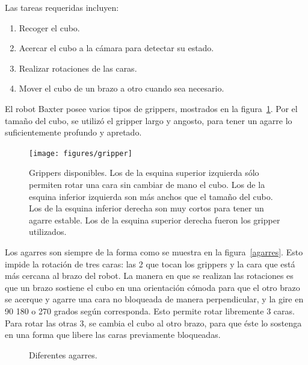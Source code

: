 Las tareas requeridas incluyen:
\begin{enumerate}
	\item Recoger el cubo.
	\item Acercar el cubo a la cámara para detectar su estado.
	\item Realizar rotaciones de las caras.
	\item Mover el cubo de un brazo a otro cuando sea necesario.
\end{enumerate}

El robot Baxter posee varios tipos de grippers, mostrados en la figura~\ref{grippers}. Por el tamaño del cubo, se utilizó el gripper largo y angosto, para tener un agarre lo suficientemente profundo y apretado.

\begin{figure}[h!]
	\centering
	\texttt{[image: figures/gripper]}
	\caption{Grippers disponibles. Los de la esquina superior izquierda sólo permiten rotar una cara sin cambiar de mano el cubo. Los de la esquina inferior izquierda son más anchos que el tamaño del cubo. Los de la esquina inferior derecha son muy cortos para tener un agarre estable. Los de la esquina superior derecha fueron los gripper utilizados.}
	\label{grippers}
\end{figure}

Los agarres son siempre de la forma como se muestra en la figura~\ref{agarres}. Esto impide la rotación de tres caras: las 2 que tocan los grippers y la cara que está más cercana al brazo del robot. La manera en que se realizan las rotaciones es que un brazo sostiene el cubo en una orientación cómoda para que el otro brazo se acerque y agarre una cara no bloqueada de manera perpendicular, y la gire en 90 180 o 270 grados según corresponda. Esto permite rotar libremente 3 caras. Para rotar las otras 3, se cambia el cubo al otro brazo, para que éste lo sostenga en una forma que libere las caras previamente bloqueadas.

\begin{figure}[h!]
	\centering
	\hfill
	\hfill
	\hfill
	\caption{Diferentes agarres.}
	\label{agarre}
\end{figure}

